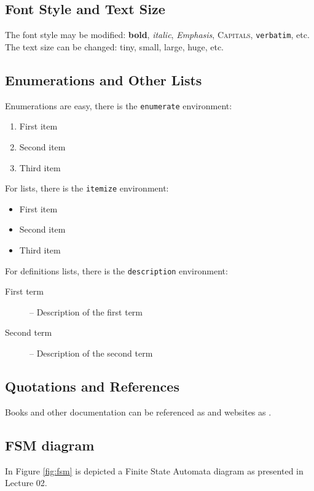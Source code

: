 \documentclass[11pt,a4paper]{report}
\begin{document}
\subsection{Font Style and Text Size}
The font style may be modified: \textbf{bold}, \textit{italic}, \emph{Emphasis}, \textsc{Capitals}, \verb|verbatim|, etc.\\
The text size can be changed: \tiny tiny, \small small, \large large, \huge huge, \normalsize etc.

\subsection{Enumerations and Other Lists}
Enumerations are easy, there is the
\texttt{enumerate} environment:
%
\begin{enumerate}
  \item First item
  \item Second item
  \item Third item
\end{enumerate}

\noindent For lists, there is the
\texttt{itemize} environment:
%
\begin{itemize}
  \item First item
  \item Second item
  \item Third item
\end{itemize}

\noindent For definitions lists, there is the \texttt{description} environment:
\begin{description}
\item[First term] -- Description of the first term
\item[Second term] -- Description of the second term
\end{description}

\subsection{Quotations and References}
Books and other documentation can be referenced as \cite{Braitenberg} and
websites as \cite{WebotsEpuck}.


\subsection{FSM diagram}

In Figure \ref{fig:fsm} is depicted a Finite State Automata diagram as presented in Lecture 02.
\end{document}
